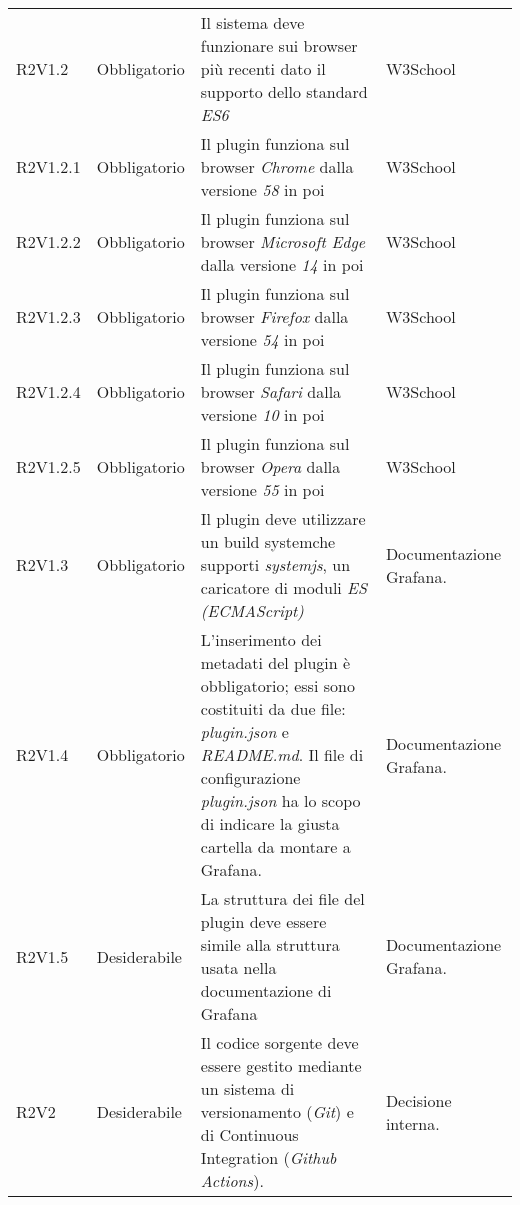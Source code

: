 \begin{longtable} {
		>{\centering}p{18mm} 
		>{\centering}p{28mm}
		>{}p{50mm} 
		>{}p{28mm}
		}
		R2V1.2 & 
		Obbligatorio & 
		Il sistema deve funzionare sui browser più recenti dato il supporto dello standard \textit{ES6} &
		W3School  \TBstrut \\ [2mm]
		
		R2V1.2.1 & 
		Obbligatorio & 
		Il plugin funziona sul browser \textit{Chrome} dalla versione \textit{58} in poi &
		W3School  \TBstrut \\ [2mm]
		
		R2V1.2.2 & 
		Obbligatorio & 
		Il plugin funziona sul browser \textit{Microsoft Edge} dalla versione \textit{14} in poi &
		W3School  \TBstrut \\ [2mm]
		
		R2V1.2.3 & 
		Obbligatorio & 
		Il plugin funziona sul browser \textit{Firefox} dalla versione \textit{54} in poi &
		W3School  \TBstrut \\ [2mm]
		
		R2V1.2.4 & 
		Obbligatorio & 
		Il plugin funziona sul browser \textit{Safari} dalla versione \textit{10} in poi &
		W3School  \TBstrut \\ [2mm]
		
		R2V1.2.5 & 
		Obbligatorio & 
		Il plugin funziona sul browser \textit{Opera} dalla versione \textit{55} in poi &
		W3School  \TBstrut \\ [2mm]
		
		R2V1.3 & 
		Obbligatorio & 
		Il plugin deve utilizzare un build system\glosp che supporti \textit{systemjs}, un caricatore di moduli \textit{ES (ECMAScript)} &
		Documentazione Grafana\glo.  \TBstrut \\ [2mm]

		R2V1.4 & 
		Obbligatorio & 
		L'inserimento dei metadati del plugin è obbligatorio; essi sono costituiti da due file: \textit{plugin.json} e \textit{README.md}. Il file di configurazione \textit{plugin.json} ha lo scopo di indicare la giusta cartella da montare a Grafana\glo . &
		Documentazione Grafana\glo.  \TBstrut \\ [2mm]
		
		R2V1.5 &
		Desiderabile &
		La struttura dei file del plugin deve essere simile alla struttura usata nella documentazione di Grafana\glo &
		Documentazione Grafana\glo.  \TBstrut \\ [2mm]
			
		R2V2 &
		Desiderabile &
		Il codice sorgente deve essere gestito mediante un sistema di versionamento (\textit{Git}) e di Continuous Integration (\textit{Github Actions}). &
		Decisione interna.  \TBstrut \\ [2mm]		
		

\end{longtable}
